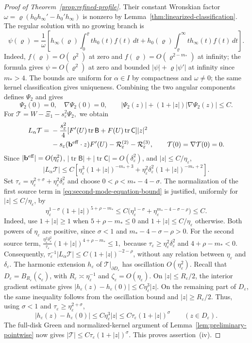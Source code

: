 \documentclass[11pt,reqno]{amsart}
\numberwithin{equation}{section}
\theoremstyle{definition}
\theoremstyle{remark}
\newcommand{\eps}{\varepsilon}
\newcommand{\etae}{\eta_{\eps}}
\newcommand{\de}{\delta_{\eps}}
\newcommand{\tr}{\operatorname{tr}}
\begin{document}
\begin{proof}[Proof of Theorem~\ref{prop:refined-profile}]
Their constant Wronskian factor
$\omega=\varrho(h_0h_\infty'-h_0'h_\infty)$ is nonzero by
Lemma~\ref{thm:linearized-classification}. The regular solution with
no growing branch is
\[
 \psi(\varrho)=\frac1\omega\left[
 h_\infty(\varrho)\int_0^\varrho t h_0(t)f(t)\,dt
 +h_0(\varrho)\int_\varrho^\infty t h_\infty(t)f(t)\,dt\right].
\]
Indeed, $f(\varrho)=O(\varrho^2)$ at zero and
$f(\varrho)=O(\varrho^{2-m_*})$ at infinity;
the formula gives $\psi=O(\varrho^2)$ at zero and bounded
$|\psi|+\varrho|\psi'|$ at infinity since $m_*>4$.
The bounds are uniform for $\alpha\in I$ by compactness and
$\omega\ne0$; the same kernel classification gives uniqueness.
Combining the two angular components defines $\Psi_2$ and gives
\begin{equation}\label{eq:Psi2-bound}
 \Psi_2(0)=0,\quad\nabla\Psi_2(0)=0,\qquad
 |\Psi_2(z)|+(1+|z|)|\nabla\Psi_2(z)|\le C.
\end{equation}
For \(
 \mathcal T=W-\Xi_1-s_\eps^2\Psi_2,\)
we obtain
\begin{align}
 L_\alpha\mathcal T
 ={}&-\frac{s_\eps^2}{4}[F'(U)\tr\mathsf B+F(U)\tr\mathsf C]|z|^2
 \notag\\
 &-s_\eps(\mathbf{b}^{\rm eff}\cdot z)F'(U)
   -\mathcal R_\eps^{(2)}-\mathcal R_\eps^{(3)},
 \qquad\mathcal T(0)=\nabla\mathcal T(0)=0.
 \label{eq:W-second-equation-correct}
\end{align}
Since $|\mathbf{b}^{\rm eff}|=O(\etae^2)$,
$|\tr\mathsf B|+|\tr\mathsf C|=O(\de^2)$, and $|z|\le C/\etae$,
\begin{equation}\label{eq:second-mode-equation-bound}
 |L_\alpha\mathcal T|
 \le C[\etae^3(1+|z|)^{-m_*+3}
       +\etae^2\de^2(1+|z|)^{-m_*+2}].
\end{equation}
Set $\tau_\eps=\etae^{2+\sigma}+\etae^2\de^2$ and choose
$0<\rho<m_*-4-\sigma$. The normalization of the first source term in
\eqref{eq:second-mode-equation-bound} is justified, uniformly for
$|z|\le C/\etae$, by
\[
 \etae^{1-\sigma}(1+|z|)^{5+\rho-m_*}
 \le C\bigl(\etae^{1-\sigma}
             +\etae^{m_*-4-\sigma-\rho}\bigr)\le C.
\]
Indeed, use $1+|z|\ge1$ when $5+\rho-m_*\le0$ and
$1+|z|\le C/\etae$ otherwise. Both powers of $\etae$ are positive,
since $\sigma<1$ and $m_*-4-\sigma-\rho>0$.
For the second source term,
\(\frac{\etae^2\de^2}{\tau_\eps} (1+|z|)^{4+\rho-m_*}\le1,\)
because $\tau_\eps\ge\etae^2\de^2$ and $4+\rho-m_*<0$.
Consequently,
$\tau_\eps^{-1}|L_\alpha\mathcal T|
\le C(1+|z|)^{-2-\rho}$, without any relation between $\etae$ and $\de$.
The harmonic extension $h_\eps$ of $\mathcal T|_{\partial D_\eps}$
has oscillation $O(\etae^2)$. Recall that
$D_\eps=B_{R_\eps}(\zeta_\eps)$, with
$R_\eps\asymp\etae^{-1}$ and $\zeta_\eps=O(\etae)$.
On $|z|\le R_\eps/2$, the interior gradient estimate gives
$|h_\eps(z)-h_\eps(0)|\le C\etae^3|z|$.
On the remaining part of $D_\eps$, the same inequality follows from
the oscillation bound and $|z|\ge R_\eps/2$.
Thus, using $\sigma<1$ and $\tau_\eps\ge\etae^{2+\sigma}$,
\[
 |h_\eps(z)-h_\eps(0)|\le C\etae^3|z|
 \le C\tau_\eps(1+|z|)^\sigma\qquad(z\in D_\eps).
\]
The full-disk Green and normalized-kernel argument of
Lemma~\ref{lem:preliminary-pointwise} now gives
$|\mathcal T|\le C\tau_\eps(1+|z|)^\sigma$.
This proves assertion~(iv).


\end{proof}
\end{document}

